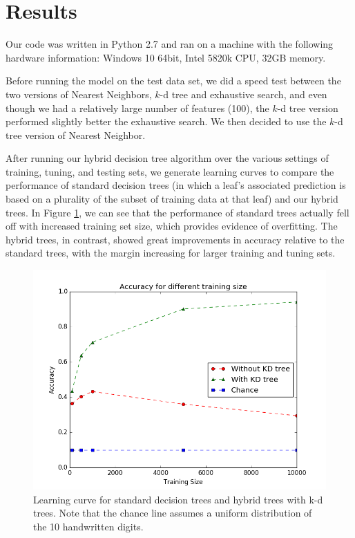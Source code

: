 \section{Results}
Our code was written in Python 2.7 and ran on a machine with the following hardware information: Windows 10 64bit, Intel 5820k CPU, 32GB memory.

Before running the model on the test data set, we did a speed test between the two versions of Nearest Neighbors, $k$-d tree and exhaustive search, and even though we had a relatively large number of features (100), the $k$-d tree version performed slightly better the exhaustive search. We then decided to use the $k$-d tree version of Nearest Neighbor. 

After running our hybrid decision tree algorithm over the various settings of training, tuning, and testing sets, we generate learning curves to compare the performance of standard decision trees (in which a leaf's associated prediction is based on a plurality of the subset of training data at that leaf) and our hybrid trees.  In Figure \ref{fig:learn_curve}, we can see that the performance of standard trees actually fell off with increased training set size, which provides evidence of overfitting. The hybrid trees, in contrast, showed great improvements in accuracy relative to the standard trees, with the margin increasing for larger training and tuning sets.

\begin{figure}
	\includegraphics[width=\linewidth]{Figures/learning_curve.png}
	\caption{Learning curve for standard decision trees and hybrid trees with k-d trees.  Note that the chance line assumes a uniform distribution of the 10 handwritten digits.}
	\label{fig:learn_curve}
\end{figure}

